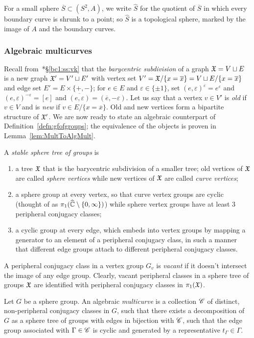 \documentclass{amsart}
\begin{document}
For a small sphere $\overline S\subset(S^2,A)$, we write $\widehat S$
for the quotient of $\overline S$ in which every boundary curve is
shrunk to a point; so $\widehat S$ is a topological sphere, marked by
the image of $A$ and the boundary curves.

\subsubsection{Algebraic multicurves}
Recall from~\cite{bartholdi-dudko:bc1}*{\S\ref{bc1:ss:vk}} that the
\emph{barycentric subdivision} of a graph ${\mathfrak X}=V\sqcup E$ is a new
graph ${\mathfrak X}'=V'\sqcup E'$ with vertex set $V'={\mathfrak X}/\{x=\overline x\}=V
\sqcup E/\{x=\overline x\}$ and edge set $E'=E\times\{+,-\}$; for
$e\in E$ and $\varepsilon\in\{\pm1\}$, set
$(e,\varepsilon)^\varepsilon=e^\varepsilon$ and
$(e,\varepsilon)^{-\varepsilon}=[e]$ and
$\overline{(e,\varepsilon)}=(\overline e,-\varepsilon)$. Let us say
that a vertex $v\in V'$ is \emph{old} if $v\in V$ and is \emph{new} if
$v\in E/\{x=\overline x\}$.  Old and new vertices form a bipartite
structure of ${\mathfrak X}'$. We are now ready to state an algebraic
counterpart of Definition~\ref{defn:gfofgroups}; the equivalence of
the objects is proven in Lemma~\ref{lem:MultToAlgMult}.
\begin{defn}\label{def:multicurve}
A \emph{stable sphere tree of groups} is 
\begin{enumerate}
\item a tree ${\mathfrak X}$ that is the barycentric subdivision of a smaller
  tree; old vertices of ${\mathfrak X}$ are called \emph{sphere vertices} while
  new vertices of ${\mathfrak X}$ are called \emph{curve vertices};
\item a sphere group at every vertex, so that curve vertex groups are
  cyclic (thought of as $\pi_1({\widehat{{\mathbb C}}}\setminus\{0,\infty\})$) while sphere
  vertex groups have at least $3$ peripheral conjugacy classes;
\item a cyclic group at every edge, which embeds into vertex groups by
  mapping a generator to an element of a peripheral conjugacy class,
  in such a manner that different edge groups attach to different
  peripheral conjugacy classes.
\end{enumerate}

A peripheral conjugacy class in a vertex group $G_v$ is \emph{vacant}
if it doesn't intersect the image of any edge group. Clearly, vacant
peripheral classes in a sphere tree of groups ${\mathfrak X}$ are identified
with peripheral conjugacy classes in $\pi_1({\mathfrak X})$.

  Let $G$ be a sphere group. An algebraic \emph{multicurve} is a
  collection ${\mathscr C}$ of distinct, non-peripheral conjugacy classes in
  $G$, such that there exists a decomposition of $G$ as a sphere tree
  of groups with edges in bijection with ${\mathscr C}$, such that the edge
  group associated with $\Gamma\in{\mathscr C}$ is cyclic and generated by a
  representative $t_\Gamma\in\Gamma$.
\end{defn}
\end{document}
